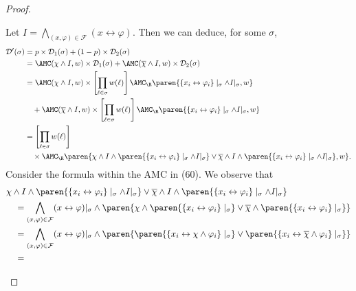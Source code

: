 \begin{proof}
\begin{itemize}[leftmargin=*]
    Let $I = \bigwedge_{(x, \varphi) \in \mathcal F} (x \leftrightarrow \varphi)$.
    Then we can deduce, for some $\sigma$,
    \begin{align}
      \mathcal D' (\sigma)
        &= p \times \mathcal D_1(\sigma) + (1-p) \times \mathcal D_2(\sigma)
        \\
        &= \AMC(\chi \land I, w) \times \mathcal D_1(\sigma) + \AMC(\overline \chi \land I, w) \times \mathcal D_2(\sigma)
        \\
        &= \AMC(\chi \land I, w) \times
          \left[ \prod_{\ell \in \sigma } w(\ell) \right]
            \AMC_{\R} \paren{
              \{x_i \leftrightarrow \varphi_i\} \mid_{\sigma} \land I|_{\sigma} , w
          }
        \\
        &\quad+ \AMC(\overline \chi \land I, w) \times
          \left[ \prod_{\ell \in \sigma} w(\ell) \right]
            \AMC_{\R} \paren{
              \{x_i \leftrightarrow \varphi_i\} \mid_{\sigma} \land I|_{\sigma} , w
          }
        \\
        &= \left[ \prod_{\ell \in \sigma} w(\ell) \right] \nonumber \\
        &\quad \times
            \AMC_{\R} \paren{
              \chi \land I \land \paren{\{x_i \leftrightarrow \varphi_i\} \mid_{\sigma} \land I|_{\sigma}}
              \lor
              \overline \chi \land I \land \paren{\{x_i \leftrightarrow \varphi_i\} \mid_{\sigma} \land I|_{\sigma}} , w
            }.
    \end{align}
    Consider the formula within the AMC in (60). We observe that
    \begin{align}
      &\chi \land I \land \paren{\{x_i \leftrightarrow \varphi_i\} \mid_{\sigma} \land I|_{\sigma}}
        \lor
        \overline \chi \land I \land \paren{\{x_i \leftrightarrow \varphi_i\} \mid_{\sigma} \land I|_{\sigma}}\\
      &\quad =
      \bigwedge_{(x, \varphi) \in \mathcal F} (x \leftrightarrow \varphi)|_{\sigma} \land \paren{\chi \land \paren{\{x_i \leftrightarrow \varphi_i\} \mid_{\sigma}}
        \lor
        \overline \chi \land \paren{\{x_i \leftrightarrow \varphi_i\} \mid_{\sigma}}}\\
      &\quad =
      \bigwedge_{(x, \varphi) \in \mathcal F} (x \leftrightarrow \varphi)|_{\sigma} \land
        \paren{\paren{\{x_i \leftrightarrow \chi \land \varphi_i\} \mid_{\sigma}}
        \lor
        \paren{\{x_i \leftrightarrow \overline \chi \land  \varphi_i\} \mid_{\sigma}}}\\
      &\quad =

\end{align}
\end{itemize}
\end{proof}
